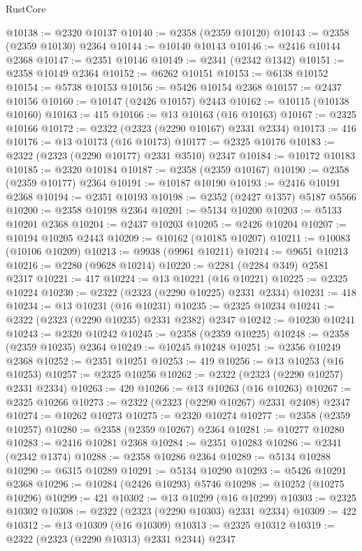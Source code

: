 \begin{lexlean}{RustCore}
\begin{coremodule}
@10138 := @2320 @10137
@10140 := @2358 (@2359 @10120)
@10143 := @2358 (@2359 @10130) @2364
@10144 := @10140 @10143
@10146 := @2416 @10144 @2368
@10147 := @2351 @10146
@10149 := @2341 (@2342 @1342)
@10151 := @2358 @10149 @2364
@10152 := @6262 @10151
@10153 := @6138 @10152
@10154 := @5738 @10153
@10156 := @5426 @10154 @2368
@10157 := @2437 @10156
@10160 := @10147 (@2426 @10157) @2443
@10162 := @10115 (@10138 @10160)
@10163 := 415
@10166 := @13 @10163 (@16 @10163)
@10167 := @2325 @10166
@10172 := @2322 (@2323 (@2290 @10167) @2331 @2334)
@10173 := 416
@10176 := @13 @10173 (@16 @10173)
@10177 := @2325 @10176
@10183 := @2322 (@2323 (@2290 @10177) @2331 @3510) @2347
@10184 := @10172 @10183
@10185 := @2320 @10184
@10187 := @2358 (@2359 @10167)
@10190 := @2358 (@2359 @10177) @2364
@10191 := @10187 @10190
@10193 := @2416 @10191 @2368
@10194 := @2351 @10193
@10198 := @2352 (@2427 @1357) @5187 @5566
@10200 := @2358 @10198 @2364
@10201 := @5134 @10200
@10203 := @5133 @10201 @2368
@10204 := @2437 @10203
@10205 := @2426 @10204
@10207 := @10194 @10205 @2443
@10209 := @10162 (@10185 @10207)
@10211 := @10083 (@10106 @10209)
@10213 := @9938 (@9961 @10211)
@10214 := @9651 @10213
@10216 := @2280 (@9628 @10214)
@10220 := @2281 (@2284 @349) @2581 @2317
@10221 := 417
@10224 := @13 @10221 (@16 @10221)
@10225 := @2325 @10224
@10230 := @2322 (@2323 (@2290 @10225) @2331 @2334)
@10231 := 418
@10234 := @13 @10231 (@16 @10231)
@10235 := @2325 @10234
@10241 := @2322 (@2323 (@2290 @10235) @2331 @2382) @2347
@10242 := @10230 @10241
@10243 := @2320 @10242
@10245 := @2358 (@2359 @10225)
@10248 := @2358 (@2359 @10235) @2364
@10249 := @10245 @10248
@10251 := @2356 @10249 @2368
@10252 := @2351 @10251
@10253 := 419
@10256 := @13 @10253 (@16 @10253)
@10257 := @2325 @10256
@10262 := @2322 (@2323 (@2290 @10257) @2331 @2334)
@10263 := 420
@10266 := @13 @10263 (@16 @10263)
@10267 := @2325 @10266
@10273 := @2322 (@2323 (@2290 @10267) @2331 @2408) @2347
@10274 := @10262 @10273
@10275 := @2320 @10274
@10277 := @2358 (@2359 @10257)
@10280 := @2358 (@2359 @10267) @2364
@10281 := @10277 @10280
@10283 := @2416 @10281 @2368
@10284 := @2351 @10283
@10286 := @2341 (@2342 @1374)
@10288 := @2358 @10286 @2364
@10289 := @5134 @10288
@10290 := @6315 @10289
@10291 := @5134 @10290
@10293 := @5426 @10291 @2368
@10296 := @10284 (@2426 @10293) @5746
@10298 := @10252 (@10275 @10296)
@10299 := 421
@10302 := @13 @10299 (@16 @10299)
@10303 := @2325 @10302
@10308 := @2322 (@2323 (@2290 @10303) @2331 @2334)
@10309 := 422
@10312 := @13 @10309 (@16 @10309)
@10313 := @2325 @10312
@10319 := @2322 (@2323 (@2290 @10313) @2331 @2344) @2347

\end{coremodule}
\end{lexlean}
